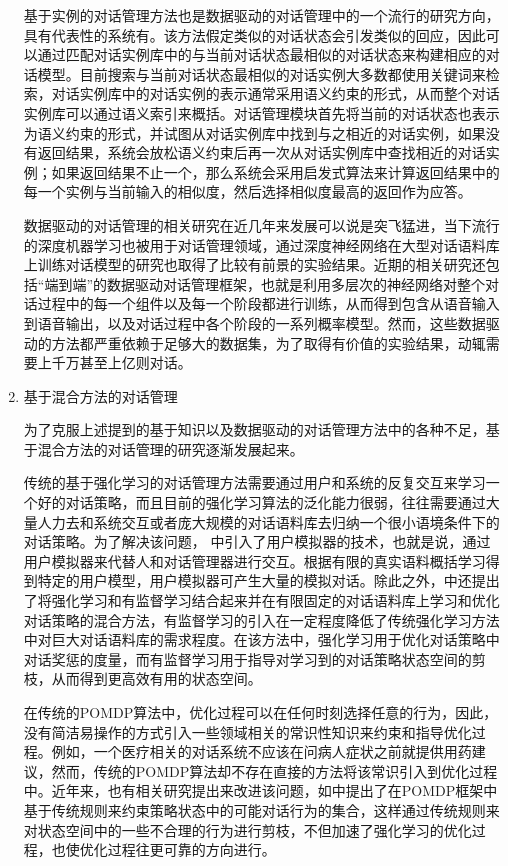 \begin{enumerate}
基于实例的对话管理方法也是数据驱动的对话管理中的一个流行的研究方向，具有代表性的系统有\cite{Murao2003, Inui2001, Lee2009c}。该方法假定类似的对话状态会引发类似的回应，因此可以通过匹配对话实例库中的与当前对话状态最相似的对话状态来构建相应的对话模型。目前搜索与当前对话状态最相似的对话实例大多数都使用关键词来检索，对话实例库中的对话实例的表示通常采用语义约束的形式，从而整个对话实例库可以通过语义索引来概括\cite{Lee2009c}。对话管理模块首先将当前的对话状态也表示为语义约束的形式，并试图从对话实例库中找到与之相近的对话实例，如果没有返回结果，系统会放松语义约束后再一次从对话实例库中查找相近的对话实例；如果返回结果不止一个，那么系统会采用启发式算法来计算返回结果中的每一个实例与当前输入的相似度，然后选择相似度最高的返回作为应答。

数据驱动的对话管理的相关研究在近几年来发展可以说是突飞猛进，当下流行的深度机器学习也被用于对话管理领域，通过深度神经网络在大型对话语料库上训练对话模型的研究也取得了比较有前景的实验结果\cite{Shang2015, Sordoni2015b, VinyalsLe2015}。近期的相关研究还包括“端到端”的数据驱动对话管理框架，也就是利用多层次的神经网络对整个对话过程中的每一个组件以及每一个阶段都进行训练，从而得到包含从语音输入到语音输出，以及对话过程中各个阶段的一系列概率模型\cite{Serban2015}。然而，这些数据驱动的方法都严重依赖于足够大的数据集，为了取得有价值的实验结果，动辄需要上千万甚至上亿则对话。

\item 基于混合方法的对话管理

为了克服上述提到的基于知识以及数据驱动的对话管理方法中的各种不足，基于混合方法的对话管理的研究逐渐发展起来。

传统的基于强化学习的对话管理方法需要通过用户和系统的反复交互来学习一个好的对话策略，而且目前的强化学习算法的泛化能力很弱，往往需要通过大量人力去和系统交互或者庞大规模的对话语料库去归纳一个很小语境条件下的对话策略。为了解决该问题，\cite{Pietquin2006, Schatzmann2007} 中引入了用户模拟器的技术，也就是说，通过用户模拟器来代替人和对话管理器进行交互。根据有限的真实语料概括学习得到特定的用户模型，用户模拟器可产生大量的模拟对话。除此之外，\cite{Henderson2008}中还提出了将强化学习和有监督学习结合起来并在有限固定的对话语料库上学习和优化对话策略的混合方法，有监督学习的引入在一定程度降低了传统强化学习方法中对巨大对话语料库的需求程度。在该方法中，强化学习用于优化对话策略中对话奖惩的度量，而有监督学习用于指导对学习到的对话策略状态空间的剪枝，从而得到更高效有用的状态空间。

在传统的POMDP算法中，优化过程可以在任何时刻选择任意的行为，因此，没有简洁易操作的方式引入一些领域相关的常识性知识来约束和指导优化过程。例如，一个医疗相关的对话系统不应该在问病人症状之前就提供用药建议，然而，传统的POMDP算法却不存在直接的方法将该常识引入到优化过程中。近年来，也有相关研究提出来改进该问题，如\cite{Lemon2006, Williams2008b}中提出了在POMDP框架中基于传统规则来约束策略状态中的可能对话行为的集合，这样通过传统规则来对状态空间中的一些不合理的行为进行剪枝，不但加速了强化学习的优化过程，也使优化过程往更可靠的方向进行。


\end{enumerate}
